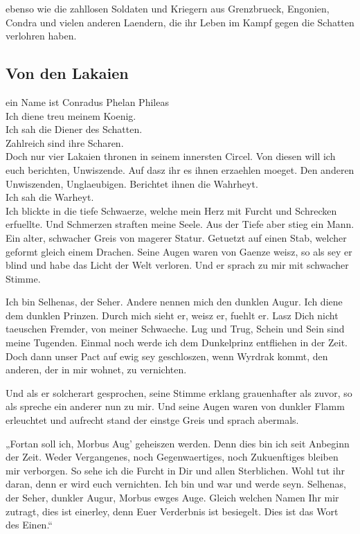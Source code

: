 \documentclass[a5paper,8pt]{book}
\begin{document}
ebenso wie die zahllosen Soldaten und Kriegern aus Grenzbrueck, Engonien, Condra und vielen anderen Laendern, die ihr Leben im Kampf gegen die Schatten verlohren haben.

\newpage

\subsection{ Von den Lakaien}

ein Name ist Conradus Phelan Phileas\\
Ich diene treu meinem Koenig.\\
Ich sah die Diener des Schatten.\\
Zahlreich sind ihre Scharen.\\
Doch nur vier Lakaien thronen in seinem innersten Circel. Von diesen will ich euch berichten, Unwiszende. Auf dasz ihr es ihnen erzaehlen moeget. Den anderen Unwiszenden, Unglaeubigen. Berichtet ihnen die Wahrheyt.\\

Ich sah die Warheyt.\\

Ich blickte in die tiefe Schwaerze, welche mein Herz mit Furcht und Schrecken erfuellte. Und Schmerzen straften meine Seele.
Aus der Tiefe aber stieg ein Mann. Ein alter, schwacher Greis von magerer Statur. Getuetzt auf einen Stab, welcher geformt gleich einem Drachen. Seine Augen waren von Gaenze weisz, so als sey er blind und habe das Licht der Welt verloren. Und er sprach zu mir mit schwacher Stimme.

Ich bin Selhenas, der Seher. Andere nennen mich den dunklen Augur. Ich diene dem dunklen Prinzen. Durch mich sieht er, weisz er, fuehlt er. Lasz Dich nicht taeuschen Fremder, von meiner Schwaeche. Lug und Trug, Schein und Sein sind meine Tugenden.
Einmal noch werde ich dem Dunkelprinz entfliehen in der Zeit. Doch dann unser Pact auf ewig sey geschloszen, wenn Wyrdrak kommt, den anderen, der in mir wohnet, zu vernichten. 

Und als er solcherart gesprochen, seine Stimme erklang grauenhafter als zuvor, so als spreche ein anderer nun zu mir. Und seine Augen waren von dunkler Flamm erleuchtet und aufrecht stand der einstge Greis und sprach abermals.

„Fortan soll ich, Morbus Aug’ geheiszen werden. Denn dies bin ich seit Anbeginn der Zeit. Weder Vergangenes, noch Gegenwaertiges, noch Zukuenftiges bleiben mir verborgen. So sehe ich die Furcht in Dir und allen Sterblichen. Wohl tut ihr daran, denn er wird euch vernichten. Ich bin und war und werde seyn. Selhenas, der Seher, dunkler Augur, Morbus ewges Auge. Gleich welchen Namen Ihr mir zutragt, dies ist einerley, denn Euer Verderbnis ist besiegelt. Dies ist das Wort des Einen.“
\end{document}
